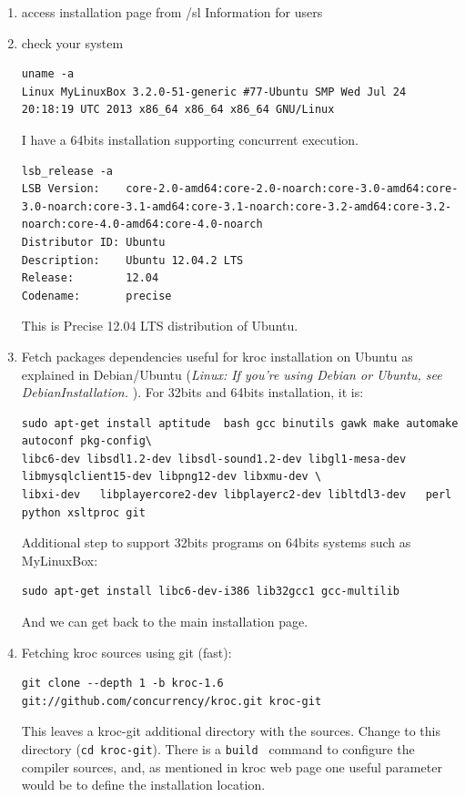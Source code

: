 \documentclass[times,a4paper]{book}
\begin{document}
\begin{enumerate}
\item access installation page from {/sl Information for users}
\item check your system\\
\begin{lstlisting}
uname -a
Linux MyLinuxBox 3.2.0-51-generic #77-Ubuntu SMP Wed Jul 24 20:18:19 UTC 2013 x86_64 x86_64 x86_64 GNU/Linux
\end{lstlisting}

I have a 64bits installation supporting concurrent execution.
\begin{lstlisting} 
lsb_release -a
LSB Version:    core-2.0-amd64:core-2.0-noarch:core-3.0-amd64:core-3.0-noarch:core-3.1-amd64:core-3.1-noarch:core-3.2-amd64:core-3.2-noarch:core-4.0-amd64:core-4.0-noarch
Distributor ID: Ubuntu
Description:    Ubuntu 12.04.2 LTS
Release:        12.04
Codename:       precise
\end{lstlisting}

This is Precise 12.04 LTS distribution of Ubuntu.
\item Fetch packages dependencies useful for kroc installation on Ubuntu as explained in Debian/Ubuntu
({\sl Linux:   If you're using Debian or Ubuntu, see DebianInstallation. }). For 32bits and 64bits installation, it is:
\begin{lstlisting} 
sudo apt-get install aptitude  bash gcc binutils gawk make automake autoconf pkg-config\
libc6-dev libsdl1.2-dev libsdl-sound1.2-dev libgl1-mesa-dev   libmysqlclient15-dev libpng12-dev libxmu-dev \
libxi-dev   libplayercore2-dev libplayerc2-dev libltdl3-dev   perl python xsltproc git
\end{lstlisting} 

Additional step to support 32bits programs on 64bits systems such as MyLinuxBox:
\begin{lstlisting} 
sudo apt-get install libc6-dev-i386 lib32gcc1 gcc-multilib
\end{lstlisting} 

And we can get back to the main installation page.

\item Fetching kroc sources using git (fast):

\begin{lstlisting}  
git clone --depth 1 -b kroc-1.6 git://github.com/concurrency/kroc.git kroc-git
\end{lstlisting}  

This leaves a kroc-git additional directory with the sources. Change to this directory ({\tt cd kroc-git}).
There is a {\tt build } command to configure the compiler sources, and, as mentioned in kroc web page
one useful parameter would be to define the installation location.


\end{enumerate}
\end{document}
